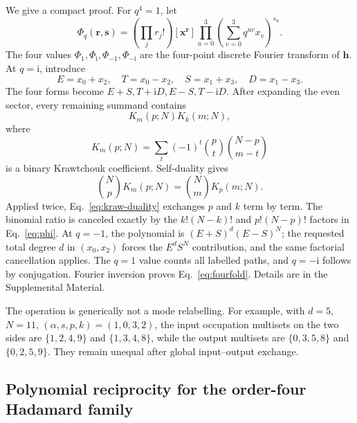\documentclass[aps,pra,reprint,amsmath,amssymb,superscriptaddress,longbibliography]{revtex4-2}
\newcommand{\ii}{\mathrm{i}}
\begin{document}
We give a compact proof.  For $q^4=1$, let
\begin{equation}
\Phi_q(\bm r,\bm s)=
\left(\prod_jr_j!\right)
[\bm x^{\bm r}]
\prod_{u=0}^{3}\left(\sum_{v=0}^{3}q^{uv}x_v\right)^{s_u}.
\label{eq:phi}
\end{equation}
The four values $\Phi_1,\Phi_{\ii},\Phi_{-1},\Phi_{-\ii}$ are the
four-point discrete Fourier transform of $\bm h$.
At $q=\ii$, introduce
\begin{equation}
E=x_0+x_2,\quad T=x_0-x_2,\quad
S=x_1+x_3,\quad D=x_1-x_3.
\end{equation}
The four forms become $E+S,T+\ii D,E-S,T-\ii D$.
After expanding the even sector, every remaining summand contains
\begin{equation}
K_m(p;N)K_k(m;N),
\end{equation}
where
\begin{equation}
K_m(p;N)=\sum_t(-1)^t
\binom pt\binom{N-p}{m-t}
\end{equation}
is a binary Krawtchouk coefficient.  Self-duality gives
\begin{equation}
\binom NpK_m(p;N)=\binom NmK_p(m;N).
\label{eq:kraw-duality}
\end{equation}
Applied twice, Eq.~\eqref{eq:kraw-duality} exchanges $p$ and $k$
term by term.  The binomial ratio is canceled exactly by the
$k!(N-k)!$ and $p!(N-p)!$ factors in Eq.~\eqref{eq:phi}.
At $q=-1$, the polynomial is $(E+S)^d(E-S)^N$; the requested total
degree $d$ in $(x_0,x_2)$ forces the $E^dS^N$ contribution, and the same
factorial cancellation applies.  The $q=1$ value counts all labelled paths,
and $q=-\ii$ follows by conjugation.  Fourier inversion proves
Eq.~\eqref{eq:fourfold}.  Details are in the Supplemental Material.

The operation is generically not a mode relabelling.  For example, with
$d=5$, $N=11$, $(\alpha,s,p,k)=(1,0,3,2)$, the input occupation multisets
on the two sides are $\{1,2,4,9\}$ and $\{1,3,4,8\}$, while the output
multisets are $\{0,3,5,8\}$ and $\{0,2,5,9\}$.  They remain unequal after
global input--output exchange.

\subsection{Polynomial reciprocity for the order-four Hadamard family}
\end{document}
